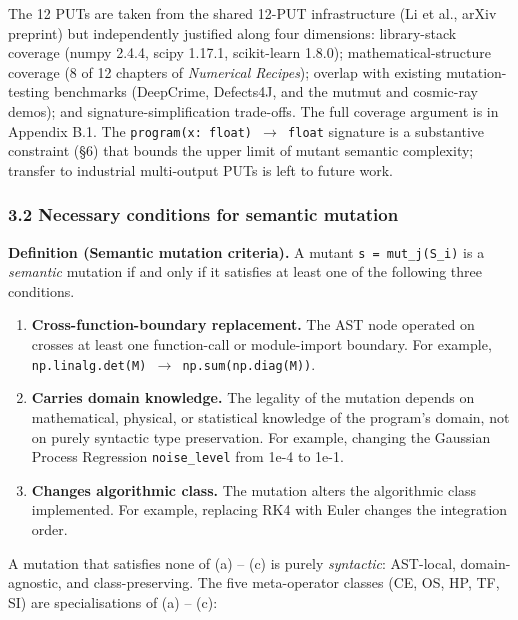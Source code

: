 \documentclass[review,12pt,authoryear]{elsarticle}
\newcounter{none}                   %
\begin{document}
The 12 PUTs are taken from the shared 12-PUT infrastructure (Li et al., arXiv preprint) but
independently justified along four dimensions: library-stack coverage
(numpy 2.4.4, scipy 1.17.1, scikit-learn 1.8.0); mathematical-structure
coverage (8 of 12 chapters of \emph{Numerical Recipes}); overlap with
existing mutation-testing benchmarks (DeepCrime, Defects4J, and the
mutmut and cosmic-ray demos); and signature-simplification trade-offs.
The full coverage argument is in Appendix B.1. The
\texttt{program(x:\ float)\ $\to$\ float} signature is a substantive
constraint (§6) that bounds the upper limit of mutant semantic
complexity; transfer to industrial multi-output PUTs is left to
future work.

\subsubsection{3.2 Necessary conditions for semantic mutation}\label{necessary-conditions-for-semantic-mutation-layer-1}

\textbf{Definition (Semantic mutation criteria).} A mutant
\texttt{s\textquotesingle{}\ =\ mut\_j(S\_i)} is a \emph{semantic}
mutation if and only if it satisfies at least one of the following three
conditions.

\begin{enumerate}
\def\labelenumi{(\alph{enumi})}
\item
  \textbf{Cross-function-boundary replacement.} The AST node operated on
  crosses at least one function-call or module-import boundary. For
  example, \texttt{np.linalg.det(M)\ $\to$\ np.sum(np.diag(M))}.
\item
  \textbf{Carries domain knowledge.} The legality of the mutation
  depends on mathematical, physical, or statistical knowledge of the
  program's domain, not on purely syntactic type preservation. For
  example, changing the Gaussian Process Regression
  \texttt{noise\_level} from 1e-4 to 1e-1.
\item
  \textbf{Changes algorithmic class.} The mutation alters the
  algorithmic class implemented. For example, replacing RK4 with Euler
  changes the integration order.
\end{enumerate}

A mutation that satisfies none of (a) -- (c) is purely \emph{syntactic}:
AST-local, domain-agnostic, and class-preserving. The five meta-operator
classes (CE, OS, HP, TF, SI) are specialisations of (a) -- (c):
\end{document}
